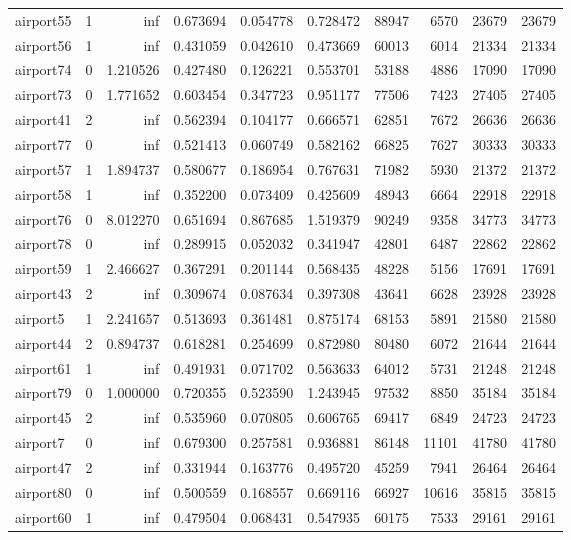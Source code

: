 \documentclass[../../../thesis.tex]{subfiles}
\begin{document}
\begin{longtable}{|l|r|r|r|r|r|r|r|r|r|}
airport55 & 1 & inf & 0.673694 & 0.054778 & 0.728472 & 88947 & 6570 & 23679 & 23679 \\
airport56 & 1 & inf & 0.431059 & 0.042610 & 0.473669 & 60013 & 6014 & 21334 & 21334 \\
airport74 & 0 & 1.210526 & 0.427480 & 0.126221 & 0.553701 & 53188 & 4886 & 17090 & 17090 \\
airport73 & 0 & 1.771652 & 0.603454 & 0.347723 & 0.951177 & 77506 & 7423 & 27405 & 27405 \\
airport41 & 2 & inf & 0.562394 & 0.104177 & 0.666571 & 62851 & 7672 & 26636 & 26636 \\
airport77 & 0 & inf & 0.521413 & 0.060749 & 0.582162 & 66825 & 7627 & 30333 & 30333 \\
airport57 & 1 & 1.894737 & 0.580677 & 0.186954 & 0.767631 & 71982 & 5930 & 21372 & 21372 \\
airport58 & 1 & inf & 0.352200 & 0.073409 & 0.425609 & 48943 & 6664 & 22918 & 22918 \\
airport76 & 0 & 8.012270 & 0.651694 & 0.867685 & 1.519379 & 90249 & 9358 & 34773 & 34773 \\
airport78 & 0 & inf & 0.289915 & 0.052032 & 0.341947 & 42801 & 6487 & 22862 & 22862 \\
airport59 & 1 & 2.466627 & 0.367291 & 0.201144 & 0.568435 & 48228 & 5156 & 17691 & 17691 \\
airport43 & 2 & inf & 0.309674 & 0.087634 & 0.397308 & 43641 & 6628 & 23928 & 23928 \\
airport5 & 1 & 2.241657 & 0.513693 & 0.361481 & 0.875174 & 68153 & 5891 & 21580 & 21580 \\
airport44 & 2 & 0.894737 & 0.618281 & 0.254699 & 0.872980 & 80480 & 6072 & 21644 & 21644 \\
airport61 & 1 & inf & 0.491931 & 0.071702 & 0.563633 & 64012 & 5731 & 21248 & 21248 \\
airport79 & 0 & 1.000000 & 0.720355 & 0.523590 & 1.243945 & 97532 & 8850 & 35184 & 35184 \\
airport45 & 2 & inf & 0.535960 & 0.070805 & 0.606765 & 69417 & 6849 & 24723 & 24723 \\
airport7 & 0 & inf & 0.679300 & 0.257581 & 0.936881 & 86148 & 11101 & 41780 & 41780 \\
airport47 & 2 & inf & 0.331944 & 0.163776 & 0.495720 & 45259 & 7941 & 26464 & 26464 \\
airport80 & 0 & inf & 0.500559 & 0.168557 & 0.669116 & 66927 & 10616 & 35815 & 35815 \\
airport60 & 1 & inf & 0.479504 & 0.068431 & 0.547935 & 60175 & 7533 & 29161 & 29161 \\

\end{longtable}
\end{document}
